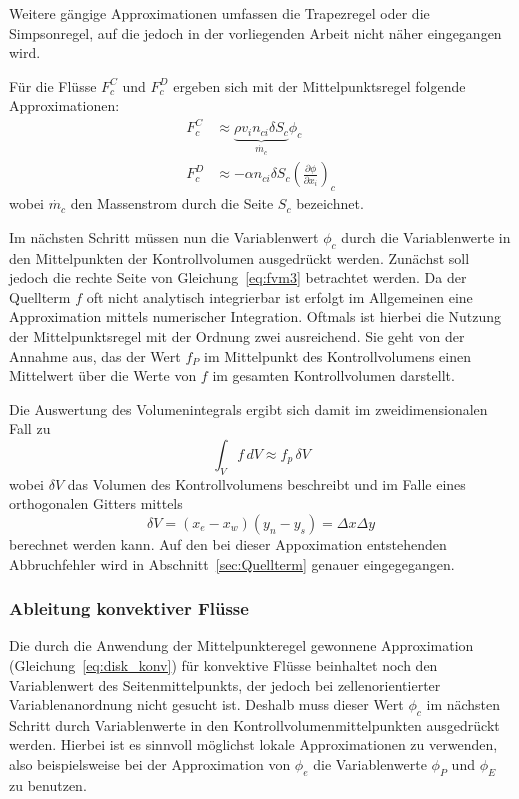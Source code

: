 Weitere gängige Approximationen umfassen die Trapezregel oder die Simpsonregel, auf die jedoch
in der vorliegenden Arbeit nicht näher eingegangen wird.

Für die Flüsse $F_c^C$ und $F_c^D$ ergeben sich mit der Mittelpunktsregel folgende Approximationen:
\begin{align}
  F_c^C &\approx \underbrace{\rho v_i n_{ci} \delta S_c}_{\dot{m_c}}  \phi_c \label{eq:disk_konv}\\
  F_c^D &\approx  -\alpha  n_{ci} \delta S_c \left(\frac{\partial \phi}{\partial x_i}\right)_c\label{eq:disk_dif}
\end{align}
wobei $\dot{m_c}$ den Massenstrom durch die Seite $S_c$ bezeichnet.

Im nächsten Schritt müssen nun die Variablenwert $\phi_c$ durch die Variablenwerte in den
Mittelpunkten der Kontrollvolumen ausgedrückt werden.
Zunächst soll jedoch die rechte Seite von Gleichung~\eqref{eq:fvm3} betrachtet werden.
Da der Quellterm $f$ oft nicht analytisch integrierbar ist erfolgt im Allgemeinen eine Approximation
mittels numerischer Integration. Oftmals ist hierbei die Nutzung der Mittelpunktsregel mit der Ordnung zwei
ausreichend. Sie geht von der Annahme aus, das der Wert $f_P$ im Mittelpunkt des Kontrollvolumens
einen Mittelwert über die Werte von $f$ im gesamten Kontrollvolumen darstellt.

Die Auswertung des Volumenintegrals ergibt sich damit im zweidimensionalen Fall zu
\begin{equation}
  \int_V f\,dV \approx f_p\,\delta V
\end{equation}
wobei $\delta V$ das Volumen des Kontrollvolumens beschreibt und im Falle eines orthogonalen Gitters
mittels
\begin{equation}
  \delta V = (x_e - x_w)(y_n-y_s) = \Delta x \Delta y
\end{equation}
berechnet werden kann. Auf den bei dieser Appoximation entstehenden Abbruchfehler wird in
Abschnitt~\ref{sec:Quellterm} genauer eingegegangen.


\subsubsection{Ableitung konvektiver Flüsse}
\label{sec:konv_fluss}

Die durch die Anwendung der Mittelpunkteregel gewonnene Approximation (Gleichung~\ref{eq:disk_konv}) für konvektive
Flüsse beinhaltet noch den Variablenwert des Seitenmittelpunkts, der jedoch bei
zellenorientierter Variablenanordnung nicht gesucht ist. Deshalb muss dieser Wert $\phi_c$ im
nächsten Schritt durch Variablenwerte in den Kontrollvolumenmittelpunkten ausgedrückt werden.
Hierbei ist es sinnvoll möglichst lokale Approximationen zu verwenden, also beispielsweise
bei der Approximation von $\phi_e$ die Variablenwerte $\phi_P$ und $\phi_E$ zu benutzen.

